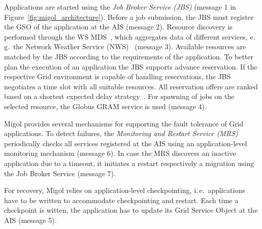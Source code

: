 \documentclass[times, 10pt,twocolumn]{article}
\begin{document}
Applications are started using the {\em Job Broker Service (JBS)} (message 1 in 
Figure~\ref{fig:migol_architecture}). Before a job
submission, the JBS must register the GSO of the application at the AIS (message 2).
Resource discovery is performed through the WS MDS~\cite{schopf06},
which aggregates data of different services, e.\,g.\ the Network
Weather Service (NWS)~\cite{NWS99} (message 3).  Available resources are matched
by the JBS according to the requirements of the application. To better plan the execution of 
an application the JBS supports advance reservation. If the respective Grid environment is capable of handling reservations, the JBS negotiates 
a time slot with all suitable resources. All reservation offers are ranked based on a shortest expected
delay strategy~\cite{Jeske:2007wj}.  For spawning of jobs on the selected resource, the Globus GRAM service is used (message 4).
             

Migol provides several mechanisms for supporting the fault tolerance of Grid applications.
To detect failures, the \emph{Monitoring and Restart Service (MRS)}
periodically checks all services registered at the AIS using an
application-level monitoring mechanism (message 6). In case the MRS discovers an inactive
application due to a timeout, it initiates a restart respectively a migration using the
Job Broker Service (message 7).  

For recovery, Migol relies on application-level checkpointing, i.\,e.\ applications have to be
written to accommodate checkpointing and restart. 
Each time a checkpoint is witten, the application has to update
its Grid Service Object at the AIS (message 5). 
\end{document}
